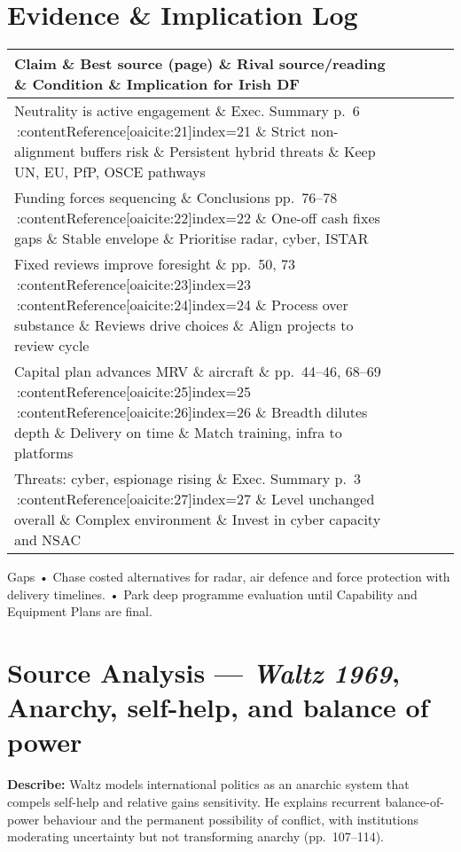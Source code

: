 \section*{Evidence \& Implication Log}
\begin{tabular}{p{3.2cm}p{4.2cm}p{3.6cm}p{3.2cm}p{4.2cm}}
	\textbf{Claim} \& \textbf{Best source (page)} \& \textbf{Rival source/reading} \& \textbf{Condition} \& \textbf{Implication for Irish DF}\\\hline
	Neutrality is active engagement \& Exec. Summary p.~6 \,:contentReference[oaicite:21]{index=21} \& Strict non-alignment buffers risk \& Persistent hybrid threats \& Keep UN, EU, PfP, OSCE pathways\\
	Funding forces sequencing \& Conclusions pp.~76–78 \,:contentReference[oaicite:22]{index=22} \& One-off cash fixes gaps \& Stable envelope \& Prioritise radar, cyber, ISTAR\\
	Fixed reviews improve foresight \& pp.~50, 73 \,:contentReference[oaicite:23]{index=23} \,:contentReference[oaicite:24]{index=24} \& Process over substance \& Reviews drive choices \& Align projects to review cycle\\
	Capital plan advances MRV \& aircraft \& pp.~44–46, 68–69 \,:contentReference[oaicite:25]{index=25} \,:contentReference[oaicite:26]{index=26} \& Breadth dilutes depth \& Delivery on time \& Match training, infra to platforms\\
	Threats: cyber, espionage rising \& Exec. Summary p.~3 \,:contentReference[oaicite:27]{index=27} \& Level unchanged overall \& Complex environment \& Invest in cyber capacity and NSAC\\
\end{tabular}


Gaps
• Chase costed alternatives for radar, air defence and force protection with delivery timelines.
• Park deep programme evaluation until Capability and Equipment Plans are final.

\parencite{WALTZ_1969}

\section*{Source Analysis — \textit{Waltz 1969}, Anarchy, self-help, and balance of power}

\textbf{Describe:} Waltz models international politics as an anarchic system that compels self-help and relative gains sensitivity. He explains recurrent balance-of-power behaviour and the permanent possibility of conflict, with institutions moderating uncertainty but not transforming anarchy (pp.~107--114).

